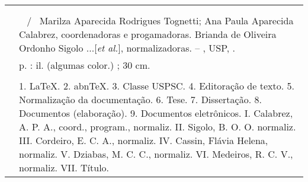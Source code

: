 %
\begin{fichacatalografica}
   \vspace*{\fill}					%
\begin{center}					%
  \imprimirnotabib \\
  \begin{table}[htb]
	\scriptsize
	\centering	
	\begin{tabular}{|p{0.9cm} p{8.7cm}|}
		\hline
	      & \\
		  &	  \imprimirautorficha     \\
		
		 \imprimircutter & 
							\hspace{0.4cm}\imprimirtitulo~ / ~{Marilza Aparecida Rodrigues Tognetti; Ana Paula Aparecida Calabrez,  coordenadoras e progamadoras. Brianda de Oliveira Ordonho Sigolo ...[\textit{et al.}], normalizadoras}.
							 -- 	\imprimirlocal, USP, \imprimirdata.   \\
		
		  &			\hspace{0.4cm}\pageref{LastPage} p. : il. (algumas color.) ; 30 cm.\\ 
 		  & \\ 
		  & \hspace{0.4cm}1. LaTeX. 2. abnTeX. 3. Classe USPSC. 4. Editoração de texto. 5. Normalização da documentação. 6. Tese. 7. Dissertação. 8. Documentos (elaboração). 9. Documentos eletrônicos. I. Calabrez, A. P. A., coord., program., normaliz. II. Sigolo, B. O. O. normaliz. III. Cordeiro, E. C. A., normaliz. IV. Cassin, Flávia Helena, normaliz. V. Dziabas, M. C. C., normaliz. VI. Medeiros, R. C. V., normaliz.  VII. Título.  \\
	
		  \hline
	\end{tabular}
  \end{table}
\end{center}
\end{fichacatalografica}
